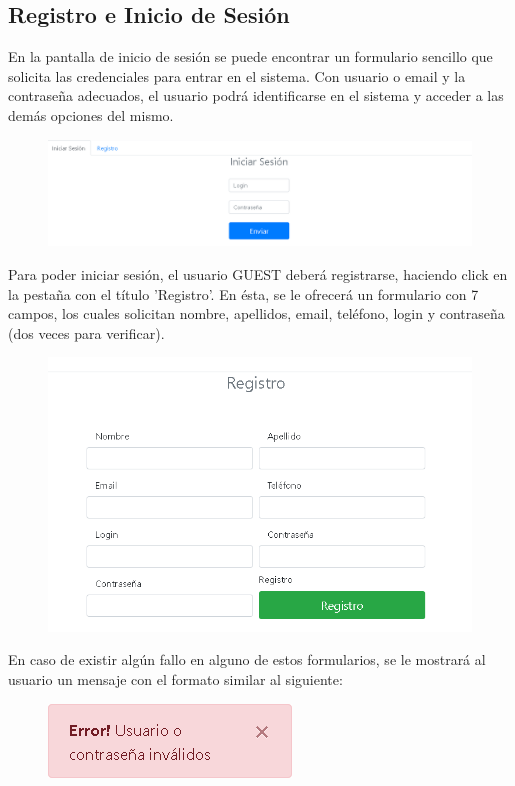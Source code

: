 \subsection{Registro e Inicio de Sesi\'{o}n}
En la pantalla de inicio de sesi\'{o}n se puede encontrar un formulario sencillo que solicita las credenciales para entrar en el sistema. Con usuario o email y la contrase\~{n}a adecuados, el usuario podr\'{a} identificarse en el sistema y acceder a las dem\'{a}s opciones del mismo.


\begin{figure}[h!]
\centering
\includegraphics[width=.7\textwidth]{Img/ManualUsuario/LOGIN.png}
\end{figure}


Para poder iniciar sesi\'{o}n, el usuario GUEST deber\'{a} registrarse, haciendo click en la pesta\~{n}a con el t\'{i}tulo 'Registro'. En \'{e}sta, se le ofrecer\'{a} un formulario con 7 campos, los cuales solicitan nombre, apellidos, email, tel\'{e}fono, login y contrase\~{n}a (dos veces para verificar).

\begin{figure}[h!]
\centering
\includegraphics[width=.4\textwidth]{Img/ManualUsuario/REGISTRO.png}
\end{figure}

En caso de existir alg\'{u}n fallo en alguno de estos formularios, se le mostrar\'{a} al usuario un mensaje con el formato similar al siguiente:

\begin{figure}[h!]
\centering
\includegraphics[width=.3\textwidth]{Img/ManualUsuario/ERROR_LOGIN.png}
\end{figure}


